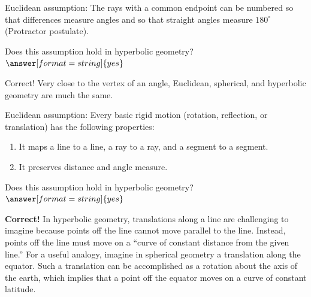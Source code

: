 \documentclass{ximera}
\begin{document}
\begin{problem} %
Euclidean assumption:  The rays with a common endpoint can be numbered so that differences measure angles and so that straight angles measure $180^\circ$ (Protractor postulate).  

Does this assumption hold in hyperbolic geometry? 
$\answer[format=string]{yes}$
\begin{feedback}[correct]
Correct!  Very close to the vertex of an angle, Euclidean, spherical, and hyperbolic geometry are much the same.  
\end{feedback}
\end{problem}

\begin{problem} %
Euclidean assumption: Every basic rigid motion (rotation, reflection, or translation) has the following properties: 
\begin{enumerate}
\item It maps a line to a line, a ray to a ray, and a segment to a segment.
\item It preserves distance and angle measure.
\end{enumerate}

Does this assumption hold in hyperbolic geometry? 
$\answer[format=string]{yes}$
\begin{feedback}[correct]
\textbf{Correct!} In hyperbolic geometry, translations along a line are challenging to imagine because points off the line cannot move parallel to the line.  Instead, points off the line must move on a ``curve of constant distance from the given line.''  For a useful analogy, imagine in spherical geometry a translation along the equator.  Such a translation can be accomplished as a rotation about the axis of the earth, which implies that a point off the equator moves on a curve of constant latitude.
\end{feedback}
\end{problem}
\end{document}
